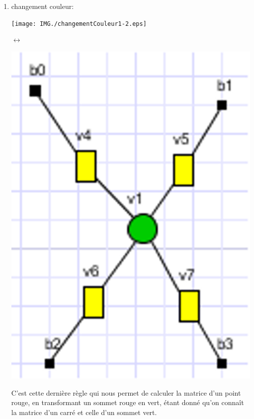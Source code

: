 \documentclass[a4paper,oneside]{book}
\begin{document}
\begin{enumerate}
\newpage

\item changement couleur:\\
\begin{center}
\begin{minipage}[c]{0.25\textwidth}
\flushright\texttt{[image: IMG./changementCouleur1-2.eps]}
\end{minipage}
\hspace{0.5cm}\Huge{$\longleftrightarrow$}
\begin{minipage}[c]{0.25\textwidth}
\includegraphics[scale=0.25]{IMG/changementCouleur2-2.eps}
\end{minipage}
\label{changementCouleur}
\end{center}
C'est cette dernière règle qui nous permet de calculer la matrice d'un point rouge, en transformant un sommet rouge en vert, étant donné qu'on connaît la matrice d'un carré et celle d'un sommet vert.


\end{enumerate}
\end{document}
